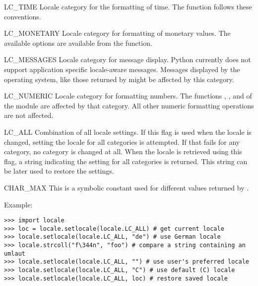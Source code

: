 \begin{datadesc}{LC_TIME}
Locale category for the formatting of time. The function
 follows these conventions.
\end{datadesc}

\begin{datadesc}{LC_MONETARY}
Locale category for formatting of monetary values. The available
options are available from the  function.
\end{datadesc}

\begin{datadesc}{LC_MESSAGES}
Locale category for message display. Python currently does not support
application specific locale-aware messages. Messages displayed by the
operating system, like those returned by 
might be affected by this category.
\end{datadesc}

\begin{datadesc}{LC_NUMERIC}
Locale category for formatting numbers. The functions
, ,  and
 of the  module are affected by that
category. All other numeric formatting operations are not affected.
\end{datadesc}

\begin{datadesc}{LC_ALL}
Combination of all locale settings. If this flag is used when the
locale is changed, setting the locale for all categories is
attempted. If that fails for any category, no category is changed at
all. When the locale is retrieved using this flag, a string indicating
the setting for all categories is returned. This string can be later
used to restore the settings.
\end{datadesc}

\begin{datadesc}{CHAR_MAX}
This is a symbolic constant used for different values returned by
.
\end{datadesc}

Example:

\begin{verbatim}
>>> import locale
>>> loc = locale.setlocale(locale.LC_ALL) # get current locale
>>> locale.setlocale(locale.LC_ALL, "de") # use German locale
>>> locale.strcoll("f\344n", "foo") # compare a string containing an umlaut 
>>> locale.setlocale(locale.LC_ALL, "") # use user's preferred locale
>>> locale.setlocale(locale.LC_ALL, "C") # use default (C) locale
>>> locale.setlocale(locale.LC_ALL, loc) # restore saved locale
\end{verbatim}

